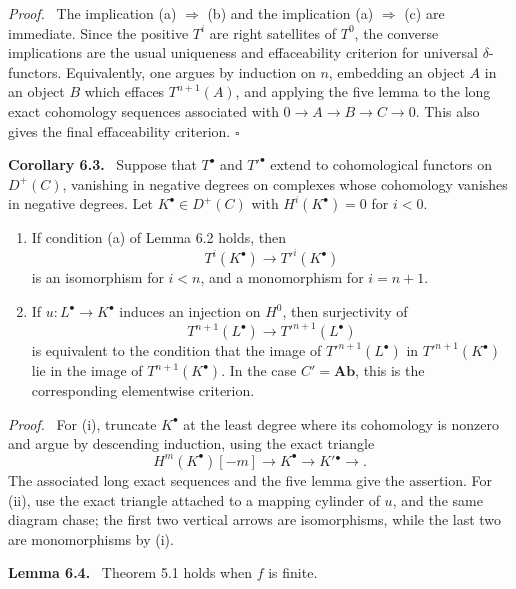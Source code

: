 \documentclass[12pt]{article}
\newcommand{\qedtext}{\hfill\(\square\)}
\newenvironment{statement}[1]{\par\medskip\noindent\textbf{#1.}\ }{\par\medskip}
\newenvironment{prooftext}[1][Proof]{\par\noindent\emph{#1.}\ }{\par\medskip}
\begin{document}
\begin{prooftext}
The implication (a) \(\Rightarrow\) (b) and the implication (a) \(\Rightarrow\) (c) are immediate. Since the positive \(T^i\) are right satellites of \(T^0\), the converse implications are the usual uniqueness and effaceability criterion for universal \(\delta\)-functors. Equivalently, one argues by induction on \(n\), embedding an object \(A\) in an object \(B\) which effaces \(T^{n+1}(A)\), and applying the five lemma to the long exact cohomology sequences associated with \(0\to A\to B\to C\to0\). This also gives the final effaceability criterion. \qedtext
\end{prooftext}

\begin{statement}{Corollary 6.3}
Suppose that \(T^\bullet\) and \({T'}^\bullet\) extend to cohomological functors on \(D^+(C)\), vanishing in negative degrees on complexes whose cohomology vanishes in negative degrees. Let \(K^\bullet\in D^+(C)\) with \(H^i(K^\bullet)=0\) for \(i<0\).
\begin{enumerate}[label=(\roman*)]
\item If condition (a) of Lemma 6.2 holds, then
\[
T^i(K^\bullet)\longrightarrow {T'}^i(K^\bullet)
\]
is an isomorphism for \(i<n\), and a monomorphism for \(i=n+1\).
\item If \(u:L^\bullet\to K^\bullet\) induces an injection on \(H^0\), then surjectivity of
\[
T^{n+1}(L^\bullet)\to {T'}^{n+1}(L^\bullet)
\]
is equivalent to the condition that the image of \({T'}^{n+1}(L^\bullet)\) in \({T'}^{n+1}(K^\bullet)\) lie in the image of \(T^{n+1}(K^\bullet)\). In the case \(C'=\mathbf{Ab}\), this is the corresponding elementwise criterion.
\end{enumerate}
\end{statement}

\begin{prooftext}
For (i), truncate \(K^\bullet\) at the least degree where its cohomology is nonzero and argue by descending induction, using the exact triangle
\[
H^m(K^\bullet)[-m]\longrightarrow K^\bullet\longrightarrow K'{}^\bullet\longrightarrow.
\]
The associated long exact sequences and the five lemma give the assertion. For (ii), use the exact triangle attached to a mapping cylinder of \(u\), and the same diagram chase; the first two vertical arrows are isomorphisms, while the last two are monomorphisms by (i).
\end{prooftext}

\begin{statement}{Lemma 6.4}
Theorem 5.1 holds when \(f\) is finite.
\end{statement}
\end{document}
